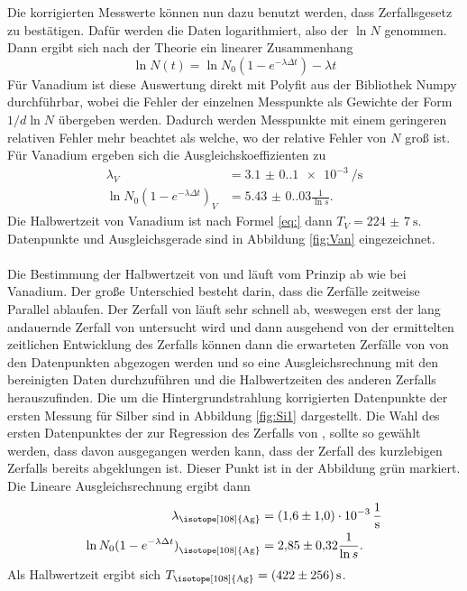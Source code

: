 \noindent Die korrigierten Messwerte können nun dazu benutzt werden, dass Zerfallsgesetz zu bestätigen.
Dafür werden die Daten logarithmiert, also der $\ln{N}$ genommen. Dann ergibt sich
nach der Theorie ein linearer Zusammenhang
\begin{equation}
    \ln{N(t)}=\ln{N_0(1-e^{-\lambda \Delta t})}-\lambda t
    \label{eq:linN}
\end{equation}
Für Vanadium ist diese Auswertung direkt mit Polyfit aus der Bibliothek Numpy \cite{numpy}
durchführbar, wobei die Fehler der einzelnen Messpunkte als Gewichte der Form $1/d\ln{N}$ übergeben werden. Dadurch werden 
Messpunkte mit einem geringeren relativen Fehler mehr beachtet als welche, wo der relative Fehler von $N$ groß ist.
Für Vanadium ergeben sich die Ausgleichskoeffizienten zu
\begin{align*}
  \lambda_V&=\qty{3.1(0.1)e-3}{\per\s}\\
  \ln{N_0(1-e^{-\lambda \Delta t})}_V&=\num{5.43(0.03)}\frac{1}{\ln{s}}.
\end{align*}
Die Halbwertzeit von Vanadium ist nach Formel \eqref{eq:} dann $T_V=\qty{224(7)}{\second}$.
Datenpunkte und Ausgleichsgerade sind in Abbildung \ref{fig:Van} eingezeichnet.\\
\\
\noindent Die Bestimmung der Halbwertzeit von  und  läuft vom Prinzip
ab wie bei Vanadium. Der große Unterschied besteht darin, dass die Zerfälle zeitweise Parallel ablaufen.
Der Zerfall von  läuft sehr schnell ab, weswegen erst der lang andauernde Zerfall von 
untersucht wird und dann ausgehend von der ermittelten zeitlichen Entwicklung
des Zerfalls können dann die erwarteten Zerfälle von  von den Datenpunkten
abgezogen werden und so eine Ausgleichsrechnung mit den bereinigten Daten durchzuführen und die Halbwertzeiten des anderen Zerfalls 
herauszufinden. Die um die Hintergrundstrahlung korrigierten Datenpunkte der 
ersten Messung für Silber sind in Abbildung \ref{fig:Si1} dargestellt. Die Wahl des ersten Datenpunktes der zur Regression des Zerfalls von , sollte
so gewählt werden, dass davon ausgegangen werden kann, dass der Zerfall des kurzlebigen Zerfalls bereits abgeklungen ist. Dieser Punkt ist in der Abbildung grün markiert.
Die Lineare Ausgleichsrechnung ergibt dann
\begin{align*}
  \lambda_\text{\isotope[108]{Ag}}&=\qty{1.6(1.0)e-3}{\per\s}\\
  \ln{N_0(1-e^{-\lambda \Delta t})}_\text{\isotope[108]{Ag}}&=\num{2.85(0.32)}\frac{1}{\ln{s}}.
\end{align*}
Als Halbwertzeit ergibt sich $T_\text{\isotope[108]{Ag}}=\qty{422(256)}{\second}$.


